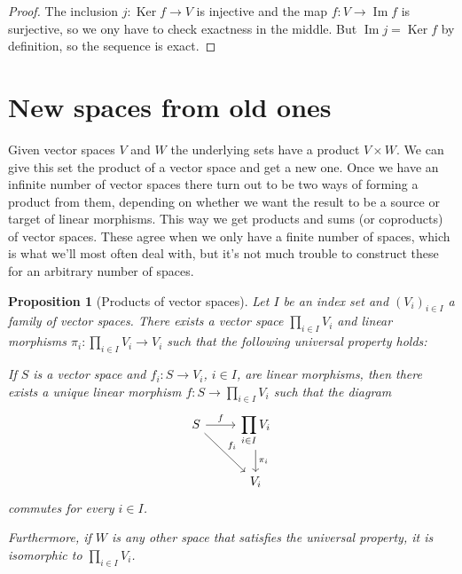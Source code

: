 \documentclass[11pt]{article}
\newtheorem{prop}[theo]{Proposition}
\theoremstyle{definition}
\DeclareMathOperator{\Ker}{Ker}
\DeclareMathOperator{\Img}{Im}
\begin{document}
\begin{proof}
The inclusion $j: \Ker f \to V$ is injective and the map $f : V \to \Img f$ is surjective, so we ony have to check exactness in the middle.
But $\Img j = \Ker f$ by definition, so the sequence is exact.
\end{proof}




\section{New spaces from old ones}


Given vector spaces $V$ and $W$ the underlying sets have a product $V \times W$.
We can give this set the product of a vector space and get a new one.
Once we have an infinite number of vector spaces there turn out to be two ways of forming a product from them, depending on whether we want the result to be a source or target of linear morphisms.
This way we get products and sums (or coproducts) of vector spaces.
These agree when we only have a finite number of spaces, which is what we'll most often deal with, but it's not much trouble to construct these for an arbitrary number of spaces.


\begin{prop}[Products of vector spaces]
\label{prop:product}
Let $I$ be an index set and $(V_i)_{i\in I}$ a family of vector spaces.
There exists a vector space $\prod_{i\in I} V_i$ and linear morphisms $\pi_i : \prod_{i \in I} V_i \to V_i$ such that the following universal property holds:

If $S$ is a vector space and $f_i : S \to V_i$, $i \in I$, are linear morphisms, then there exists a unique linear morphism $f : S \to \prod_{i \in I} V_i$ such that the diagram
\[
\begin{tikzcd}
S \ar[dr,"f_i"] \ar[r,"f"] & \displaystyle\prod_{i \in I} V_i \ar[d,"\pi_i"]
\\
             & V_i
\end{tikzcd}
\]
commutes for every $i \in I$.

Furthermore, if $W$ is any other space that satisfies the universal property, it is isomorphic to $\prod_{i \in I} V_i$.
\end{prop}
\end{document}
